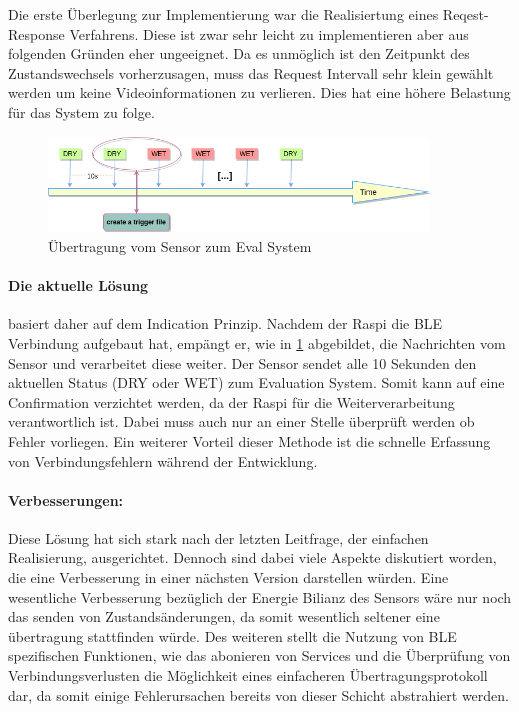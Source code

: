 Die erste Überlegung zur Implementierung war die Realisiertung eines Reqest-Response Verfahrens. Diese ist zwar sehr leicht zu implementieren aber aus folgenden Gründen eher ungeeignet. 
Da es unmöglich ist den Zeitpunkt des Zustandswechsels vorherzusagen, muss das Request Intervall sehr klein gewählt werden um keine Videoinformationen zu verlieren. Dies hat eine höhere Belastung für das System zu folge. 

\begin{figure}[h]
  \centering
  \includegraphics[width=0.9\textwidth]{includes/kom/graphics/onNotification}
  \caption{Übertragung vom Sensor zum Eval System}
  \label{fig:ble_com_pr}
\end{figure}

\paragraph{Die aktuelle Lösung} basiert daher auf dem Indication Prinzip. Nachdem der Raspi die BLE Verbindung aufgebaut hat, empängt er, wie in \ref{fig:ble_com_pr} abgebildet, die Nachrichten vom Sensor und verarbeitet diese weiter. Der Sensor sendet alle 10 Sekunden den aktuellen Status (DRY oder WET) zum Evaluation System. Somit kann auf eine Confirmation verzichtet werden, da der Raspi für die Weiterverarbeitung verantwortlich ist. Dabei muss auch nur an einer Stelle überprüft werden ob Fehler vorliegen. Ein weiterer Vorteil dieser Methode ist die schnelle Erfassung von Verbindungsfehlern während der Entwicklung.

\paragraph{Verbesserungen:} Diese Lösung hat sich stark nach der letzten Leitfrage, der einfachen Realisierung, ausgerichtet. Dennoch sind dabei viele Aspekte diskutiert worden, die eine Verbesserung in einer nächsten Version darstellen würden. Eine wesentliche Verbesserung bezüglich der Energie Bilianz des Sensors wäre nur noch das senden von Zustandsänderungen, da somit wesentlich seltener eine übertragung stattfinden würde. Des weiteren stellt die Nutzung von BLE spezifischen Funktionen, wie das abonieren von Services und die Überprüfung von Verbindungsverlusten die Möglichkeit eines einfacheren Übertragungsprotokoll dar, da somit einige Fehlerursachen bereits von dieser Schicht abstrahiert werden.

